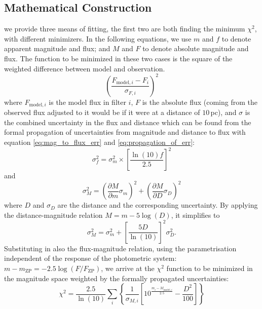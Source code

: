 \documentclass[fleqn,usenatbib]{rasti}
\begin{document}
\subsection{Mathematical Construction}
we provide three means of fitting, the first two are both finding the minimum
$\chi^2$, with different minimizers. In the following equations, we use $m$ and
$f$ to denote apparent magnitude and flux; and $M$ and $F$ to denote absolute
magnitude and flux. The function to be minimized in these two cases is the
square of the weighted difference between model and observation.
\begin{equation}
    \label{eq:lsq}
    \left(\dfrac{F_{\mathrm{model}, i} - F_{i}}{\sigma_{F, i}}\right)^{2}
\end{equation}
where $F_{\mathrm{model}, i}$ is the model flux in filter $i$, $F$ is the
absolute flux (coming from the observed flux adjusted to it would be if it
were at a distance of $10\,$pc), and $\sigma$ is the combined uncertainty in
the flux and distance which can be found from the formal propagation of
uncertainties from magnitude and distance to flux with
equation \ref{eq:mag_to_flux_err} and
\ref{eq:propagation_of_err}:
\begin{equation}
    \label{eq:mag_to_flux_err}
    \sigma_{f}^{2} = \sigma_{m}^{2} \times \left[ \dfrac{\ln(10) f}{2.5} \right]^{2}
\end{equation}
and
\begin{equation}
    \label{eq:propagation_of_err}
    \sigma_{M}^{2} = \left( \dfrac{\partial M}{\partial m} \sigma_{m} \right)^2 + \left( \dfrac{\partial M}{\partial D} \sigma_{D} \right)^2
\end{equation}
where $D$ and $\sigma_D$ are the distance and the corresponding uncertainty. By
applying the distance-magnitude relation $M = m - 5\log(D)$, it simplifies to
\begin{equation}
    \label{eq:mag_err}
    \sigma_{M}^2 = \sigma^2_{m} + \left[ \dfrac{5 D}{\ln(10)} \right]^2 \sigma_{D}^2.
\end{equation}
Substituting in also the flux-magnitude relation, using the parametrisation
independent of the response of the photometric system: $m - m_{\mathrm{ZP}}=-2.5\log(F/F_{\mathrm{ZP}})$,
we arrive at the $\chi^2$ function to be minimized in the magnitude space weighted
by the formally propagated uncertainties:
\begin{equation}
    \label{eq:chi2}
    \chi^{2} = \dfrac{2.5}{\ln(10)} \sum_{i}\left\{ \dfrac{1}{\sigma_{M, i}} \left[ 10^{\frac{m_{i} - M_{\mathrm{model}, i}}{2.5}} - \dfrac{D^{2}}{100} \right] \right\}
\end{equation}
\end{document}
